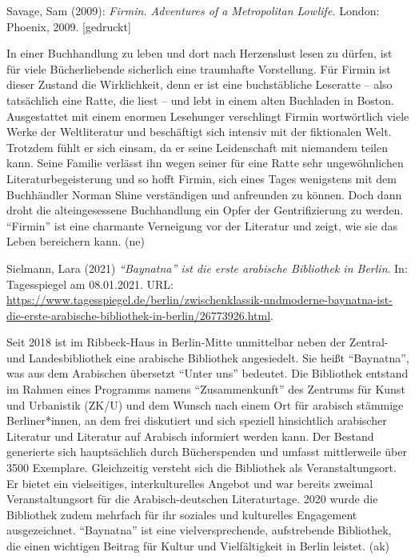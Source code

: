 \documentclass[a4paper,
fontsize=11pt,
oneside,
numbers=noperiodatend,
parskip=half-,
bibliography=totoc,
final
]{scrartcl}
\begin{document}
Savage, Sam (2009): \emph{Firmin. Adventures of a Metropolitan Lowlife.}
London: Phoenix, 2009. {[}gedruckt{]}

In einer Buchhandlung zu leben und dort nach Herzenslust lesen zu
dürfen, ist für viele Bücherliebende sicherlich eine traumhafte
Vorstellung. Für Firmin ist dieser Zustand die Wirklichkeit, denn er ist
eine buchstäbliche Leseratte -- also tatsächlich eine Ratte, die liest
-- und lebt in einem alten Buchladen in Boston. Ausgestattet mit einem
enormen Lesehunger verschlingt Firmin wortwörtlich viele Werke der
Weltliteratur und beschäftigt sich intensiv mit der fiktionalen Welt.
Trotzdem fühlt er sich einsam, da er seine Leidenschaft mit niemandem
teilen kann. Seine Familie verlässt ihn wegen seiner für eine Ratte sehr
ungewöhnlichen Literaturbegeisterung und so hofft Firmin, sich eines
Tages wenigstens mit dem Buchhändler Norman Shine verständigen und
anfreunden zu können. Doch dann droht die alteingesessene Buchhandlung
ein Opfer der Gentrifizierung zu werden. \enquote{Firmin} ist eine
charmante Verneigung vor der Literatur und zeigt, wie sie das Leben
bereichern kann. (ne)

\pagebreak

Sielmann, Lara (2021) \emph{\enquote{Baynatna} ist die erste arabische
Bibliothek in Berlin}. In: Tagesspiegel am 08.01.2021. URL:
\url{https://www.tagesspiegel.de/berlin/zwischenklassik-undmoderne-baynatna-ist-die-erste-arabische-bibliothek-in-berlin/26773926.html}.

Seit 2018 ist im Ribbeck-Haus in Berlin-Mitte unmittelbar neben der
Zentral- und Landesbibliothek eine arabische Bibliothek angesiedelt. Sie
heißt \enquote{Baynatna}, was aus dem Arabischen übersetzt
\enquote{Unter uns} bedeutet. Die Bibliothek entstand im Rahmen eines
Programms namens \enquote{Zusammenkunft} des Zentrums für Kunst und
Urbanistik (ZK/U) und dem Wunsch nach einem Ort für arabisch stämmige
Berliner*innen, an dem frei diskutiert und sich speziell hinsichtlich
arabischer Literatur und Literatur auf Arabisch informiert werden kann.
Der Bestand generierte sich hauptsächlich durch Bücherspenden und
umfasst mittlerweile über 3500 Exemplare. Gleichzeitig versteht sich die
Bibliothek als Veranstaltungsort. Er bietet ein vielseitiges,
interkulturelles Angebot und war bereits zweimal Veranstaltungsort für
die Arabisch-deutschen Literaturtage. 2020 wurde die Bibliothek zudem
mehrfach für ihr soziales und kulturelles Engagement ausgezeichnet.
\enquote{Baynatna} ist eine vielversprechende, aufstrebende Bibliothek,
die einen wichtigen Beitrag für Kultur und Vielfältigkeit in Berlin
leistet. (ak)
\end{document}
